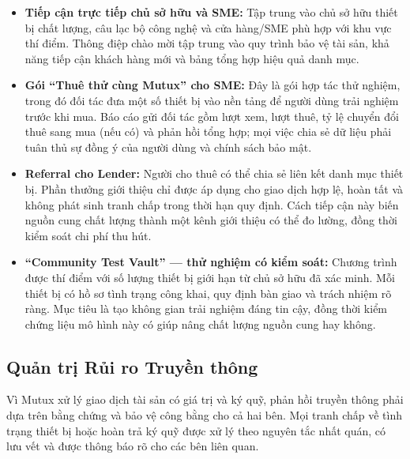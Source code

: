 \begin{itemize}
    \item \textbf{Tiếp cận trực tiếp chủ sở hữu và SME:} Tập trung vào chủ sở hữu thiết bị chất lượng, câu lạc bộ công nghệ và cửa hàng/SME phù hợp với khu vực thí điểm. Thông điệp chào mời tập trung vào quy trình bảo vệ tài sản, khả năng tiếp cận khách hàng mới và bảng tổng hợp hiệu quả danh mục.

    \item \textbf{Gói ``Thuê thử cùng Mutux'' cho SME:} Đây là gói hợp tác thử nghiệm, trong đó đối tác đưa một số thiết bị vào nền tảng để người dùng trải nghiệm trước khi mua. Báo cáo gửi đối tác gồm lượt xem, lượt thuê, tỷ lệ chuyển đổi thuê sang mua (nếu có) và phản hồi tổng hợp; mọi việc chia sẻ dữ liệu phải tuân thủ sự đồng ý của người dùng và chính sách bảo mật.

    \item \textbf{Referral cho Lender:} Người cho thuê có thể chia sẻ liên kết danh mục thiết bị. Phần thưởng giới thiệu chỉ được áp dụng cho giao dịch hợp lệ, hoàn tất và không phát sinh tranh chấp trong thời hạn quy định. Cách tiếp cận này biến nguồn cung chất lượng thành một kênh giới thiệu có thể đo lường, đồng thời kiểm soát chi phí thu hút.

    \item \textbf{``Community Test Vault'' --- thử nghiệm có kiểm soát:} Chương trình được thí điểm với số lượng thiết bị giới hạn từ chủ sở hữu đã xác minh. Mỗi thiết bị có hồ sơ tình trạng công khai, quy định bàn giao và trách nhiệm rõ ràng. Mục tiêu là tạo không gian trải nghiệm đáng tin cậy, đồng thời kiểm chứng liệu mô hình này có giúp nâng chất lượng nguồn cung hay không.
\end{itemize}

\subsection{Quản trị Rủi ro Truyền thông}

Vì Mutux xử lý giao dịch tài sản có giá trị và ký quỹ, phản hồi truyền thông phải dựa trên bằng chứng và bảo vệ công bằng cho cả hai bên. Mọi tranh chấp về tình trạng thiết bị hoặc hoàn trả ký quỹ được xử lý theo nguyên tắc nhất quán, có lưu vết và được thông báo rõ cho các bên liên quan.

